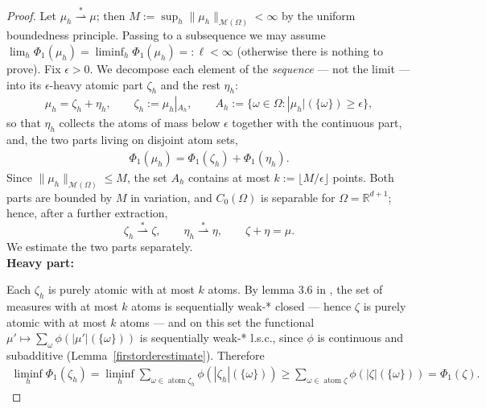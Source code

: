 \documentclass[11pt]{amsart}
\theoremstyle{definition}
\theoremstyle{remark}
\DeclareMathOperator{\atom}{atom}
\begin{document}
\begin{proof}
	Let $\mu_h \overset{*}{\rightharpoonup} \mu$; then $M := \sup_h \|\mu_h\|_{\mathcal{M}(\Omega)} < \infty$ by the uniform boundedness principle. Passing to a subsequence we may assume $\lim_h \Phi_1(\mu_h) = \liminf_h \Phi_1(\mu_h) =: \ell < \infty$ (otherwise there is nothing to prove). Fix $\epsilon > 0$. We decompose each element of the \emph{sequence} --- not the limit --- into its $\epsilon$-heavy atomic part $\zeta_h$ and the rest $\eta_h$:
	\begin{align*}
		\mu_h = \zeta_h + \eta_h, \qquad
		\zeta_h := \mu_h|_{A_h}, \qquad
		A_h:= \{ \omega \in \Omega: |\mu_h|(\{\omega\}) \ge \epsilon \},
	\end{align*}
	so that $\eta_h$ collects the atoms of mass below $\epsilon$ together with the continuous part, and, the two parts living on disjoint atom sets,
	\begin{align*}
		\Phi_1(\mu_h) = \Phi_1(\zeta_h) + \Phi_1(\eta_h).
	\end{align*}
	Since $\|\mu_h\|_{\mathcal{M}(\Omega)} \le M$, the set $A_h$ contains at most $k := \lfloor M/\epsilon \rfloor$ points. Both parts are bounded by $M$ in variation, and $C_0(\Omega)$ is separable for $\Omega = \mathbb{R}^{d+1}$; hence, after a further extraction,
	\begin{equation*}
		\zeta_h \overset{*}{\rightharpoonup} \zeta, \qquad
		\eta_h \overset{*}{\rightharpoonup} \eta, \qquad
		\zeta + \eta = \mu .
	\end{equation*}
	We estimate the two parts separately. \\
	\textbf{Heavy part:} \par
	Each $\zeta_h$ is purely atomic with at most $k$ atoms. By lemma 3.6 in \cite{bouchitte1990new}, the set of measures with at most $k$ atoms is sequentially weak-* closed --- hence $\zeta$ is purely atomic with at most $k$ atoms --- and on this set the functional $\mu' \mapsto \sum_{\omega} \phi(|\mu'|(\{\omega\}))$ is sequentially weak-* l.s.c., since $\phi$ is continuous and subadditive (Lemma~\ref{firstorderestimate}). Therefore
	\begin{align*}
		\liminf_{h} \Phi_1(\zeta_h)
		= \liminf_h  \sum_{ \omega \in \atom \zeta_h } \phi(|\zeta_{h}|(\{\omega\}))
		\ge \sum_{ \omega \in \atom \zeta } \phi(|\zeta|(\{\omega\})) = \Phi_1 ( \zeta).
	\end{align*}


\end{proof}
\end{document}
